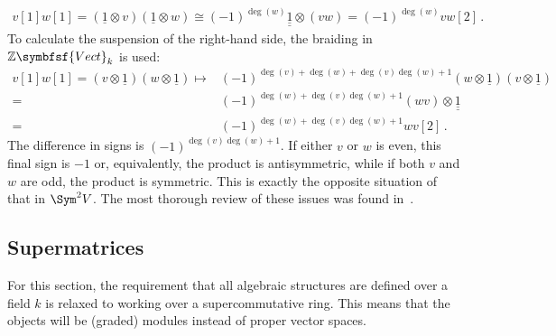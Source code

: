 \begin{remark}
\begin{gather}
            v[1]w[1]=(\underline{1}\otimes v)(\underline{1}\otimes w) \cong (-1)^{\deg(w)}\underline{\underline{1}}\otimes(vw)=(-1)^{\deg(w)}vw[2]\,.
        \end{gather}
        To calculate the suspension of the right-hand side, the braiding in $\mathbb{Z}\symbfsf{Vect}_k$ is used:
        \begin{align*}
            v[1]w[1]=(v\otimes\underline{1})(w\otimes\underline{1})\mapsto&(-1)^{\deg(v)+\deg(w)+\deg(v)\deg(w)+1}(w\otimes\underline{1})(v\otimes\underline{1})\\
            =&(-1)^{\deg(w)+\deg(v)\deg(w)+1}(wv)\otimes\underline{\underline{1}}\\
            =&(-1)^{\deg(w)+\deg(v)\deg(w)+1}wv[2]\,.
        \end{align*}
        The difference in signs is $(-1)^{\deg(v)\deg(w)+1}$. If either $v$ or $w$ is even, this final sign is $-1$ or, equivalently, the product is antisymmetric, while if both $v$ and $w$ are odd, the product is symmetric. This is exactly the opposite situation of that in $\Sym^2V$. The most thorough review of these issues was found in~\citet{miti_homotopy_2021}.
    \end{remark}

\subsection{Supermatrices}

    For this section, the requirement that all algebraic structures are defined over a field $k$ is relaxed to working over a supercommutative ring. This means that the objects will be (graded) modules instead of proper vector spaces.

